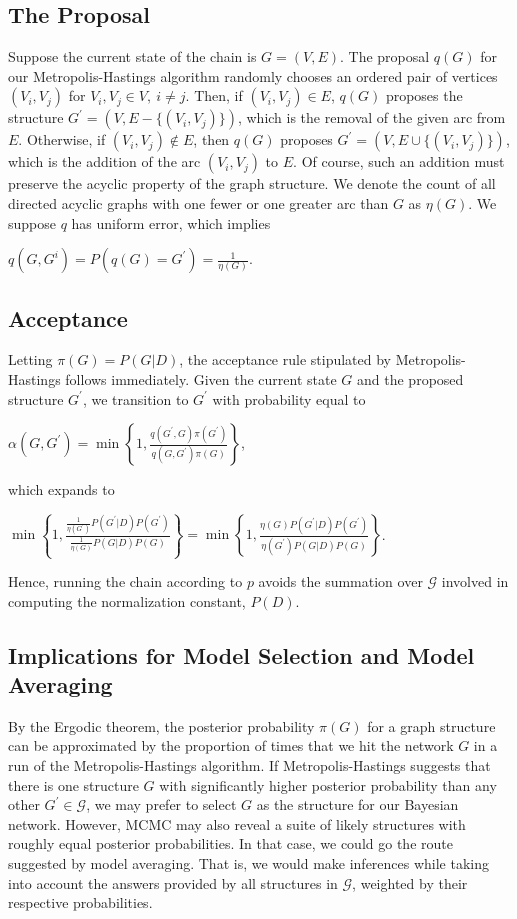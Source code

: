 \documentclass[12pt,twoside]{reedthesis}
\begin{document}
		\subsection*{The Proposal}
			Suppose the current state of the chain is $G=(V,E)$. 
			The proposal $q(G)$ for our Metropolis-Hastings algorithm randomly chooses an ordered pair of vertices $(V_i, V_j)$ for $V_i, V_j \in V, \ i \neq j$. 
			Then, if $(V_i, V_j) \in E$, $q(G)$ proposes the structure $G^{'} = (V,E - \{(V_i,V_j)\})$, which is the removal of the given arc from $E$. 
			Otherwise, if $(V_i,V_j) \not\in E$, then $q(G)$ proposes $G^{'} = (V, E \cup \{(V_i, V_j)\})$, which is the addition of the arc $(V_i, V_j)$ to $E$. Of course, such an addition must preserve the acyclic property of the graph structure. 
			We denote the count of all directed acyclic graphs with one fewer or one greater arc than $G$ as $\eta(G)$. 
			We suppose $q$ has uniform error, which implies 
			\begin{center}
			$q(G,G^{i}) = P(q(G) = G^{'}) = \frac{1}{\eta(G)}$.
			\end{center}
		\subsection*{Acceptance}
			Letting $\pi(G) = P(G|D)$,
			the acceptance rule stipulated by Metropolis-Hastings follows immediately. 
			Given the current state $G$ and the proposed structure $G^{'}$, 
			we transition to $G^{'}$ with probability equal to
			\begin{center}
				$
				\alpha(G,G^{'}) = 
				\displaystyle \min \left\{ 1, \frac{q(G^{'}, G)\pi(G^{'})}{q(G, G^{'})\pi(G)}  \right\}
				$,
			\end{center}
				which expands to
			\begin{center}
				$
				\displaystyle \min \left\{ 1, \frac{\frac{1}{\eta(G^{'})}P(G^{'} | D)P(G^{'})}{\frac{1}{\eta(G)}P(G|D)P(G)} \right\} =
				\displaystyle \min \left\{ 1, \frac{\eta(G)P(G^{'} | D)P(G^{'})}{\eta(G^{'})P(G|D)P(G)} \right\}				
				$.
			\end{center}
			Hence, running the chain according to $p$ avoids the summation over $\mathcal G$ involved in computing the normalization constant, $P(D)$.
		\subsection*{Implications for Model Selection and Model Averaging}
			By the Ergodic theorem, the posterior probability $\pi(G)$ for a graph structure can be approximated by the proportion of times that we hit the network $G$ in a run of the Metropolis-Hastings algorithm. If Metropolis-Hastings suggests that there is one structure $G$ with significantly higher posterior probability than any other $G^{'} \in \mathcal G$, we may prefer to select $G$ as the structure for our Bayesian network. However, MCMC may also reveal a suite of likely structures with roughly equal posterior probabilities. In that case, we could go the route suggested by model averaging. That is, we would make inferences while taking into account the answers provided by all structures in $\mathcal G$, weighted by their respective probabilities.
\end{document}
